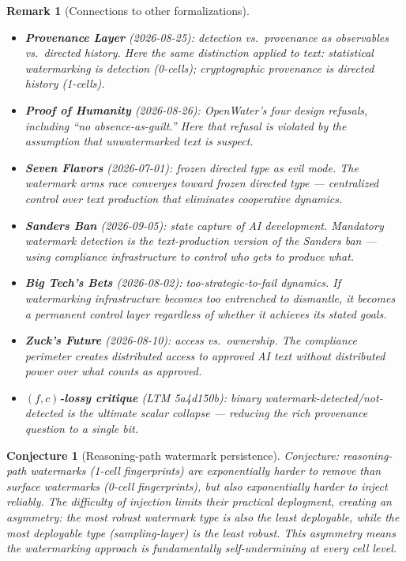 \documentclass[11pt,a4paper]{article}
\newtheorem{conjecture}[definition]{Conjecture}
\newtheorem{remark}[definition]{Remark}
\begin{document}
\begin{remark}[Connections to other formalizations]
\begin{itemize}
\item \textbf{Provenance Layer} (2026-08-25): detection vs.\ provenance
  as observables vs.\ directed history. Here the same distinction applied
  to text: statistical watermarking is detection (0-cells); cryptographic
  provenance is directed history (1-cells).
\item \textbf{Proof of Humanity} (2026-08-26): OpenWater's four design
  refusals, including ``no absence-as-guilt.'' Here that refusal is
  violated by the assumption that unwatermarked text is suspect.
\item \textbf{Seven Flavors} (2026-07-01): frozen directed type as evil
  mode. The watermark arms race converges toward frozen directed type ---
  centralized control over text production that eliminates cooperative
  dynamics.
\item \textbf{Sanders Ban} (2026-09-05): state capture of AI development.
  Mandatory watermark detection is the text-production version of the
  Sanders ban --- using compliance infrastructure to control who gets to
  produce what.
\item \textbf{Big Tech's Bets} (2026-08-02): too-strategic-to-fail
  dynamics. If watermarking infrastructure becomes too entrenched to
  dismantle, it becomes a permanent control layer regardless of whether
  it achieves its stated goals.
\item \textbf{Zuck's Future} (2026-08-10): access vs.\ ownership. The
  compliance perimeter creates distributed access to approved AI text
  without distributed power over what counts as approved.
\item \textbf{$(f,c)$-lossy critique} (LTM 5a4d150b): binary
  watermark-detected/not-detected is the ultimate scalar collapse ---
  reducing the rich provenance question to a single bit.
\end{itemize}
\end{remark}

\begin{conjecture}[Reasoning-path watermark persistence]
Conjecture: reasoning-path watermarks (1-cell fingerprints) are
exponentially harder to remove than surface watermarks (0-cell fingerprints),
but also exponentially harder to \emph{inject} reliably. The difficulty
of injection limits their practical deployment, creating an asymmetry:
the most robust watermark type is also the least deployable, while the
most deployable type (sampling-layer) is the least robust. This
asymmetry means the watermarking approach is fundamentally
self-undermining at every cell level.
\end{conjecture}
\end{document}
